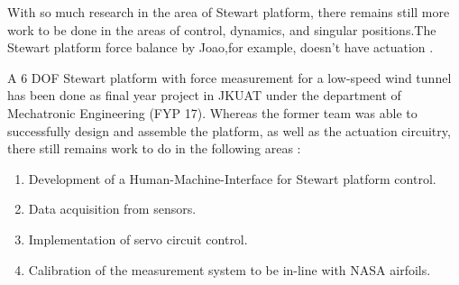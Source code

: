 With so much research in the area of Stewart platform, there remains still more work to be done in the areas of control, dynamics, and singular positions.The Stewart platform force balance by Joao,for example, doesn't have actuation \cite{ferreira2015design}. 

A 6 DOF Stewart platform with force measurement for a low-speed wind tunnel has been done as final year project in JKUAT under the department of Mechatronic Engineering (FYP 17). Whereas the former team was able to successfully design and assemble the platform, as well as the actuation circuitry, there still remains work to do in the following areas \cite{caleb}:
\begin{enumerate}
\item Development of a Human-Machine-Interface for Stewart platform control.
\item Data acquisition from sensors.
\item Implementation of servo circuit control.
\item Calibration of the measurement system to be in-line with NASA airfoils.
\end{enumerate}